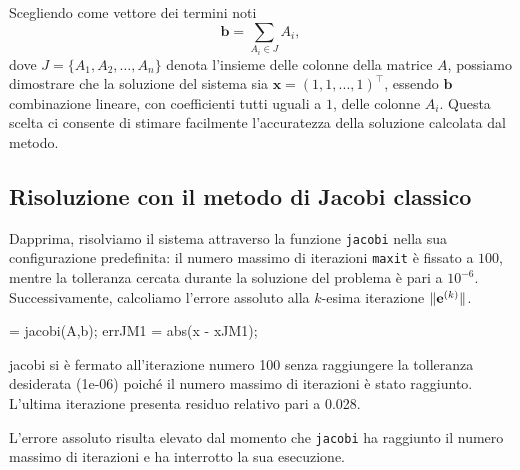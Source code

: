 Scegliendo come vettore dei termini noti
\begin{equation*}
    \mathbf{b} = \sum_ {A_{i} \in J} A_{i},
\end{equation*}
dove $J = \{A_{1}, A_{2},\dots,A_{n}\}$ denota l'insieme delle colonne della matrice $A$, possiamo dimostrare che la soluzione
del sistema sia $\mathbf{x} = (1, 1, ..., 1)^\top$, essendo $\mathbf{b}$ combinazione lineare, con coefficienti tutti uguali a $\num{1}$, delle colonne $A_{i}$. \newline
Questa scelta ci consente di stimare facilmente l'accuratezza della soluzione calcolata dal metodo.
\subsection{Risoluzione con il metodo di Jacobi classico}
Dapprima, risolviamo il sistema attraverso la funzione \lstinline{jacobi} nella sua configurazione predefinita:
il numero massimo di iterazioni \lstinline{maxit} \`e fissato a $\num{100}$, mentre la tolleranza cercata durante la soluzione del problema \`e pari a ${10}^{-6}$.\newline
    Successivamente, calcoliamo l'errore assoluto alla $k$-esima iterazione $\lVert\mathbf{e}^{(k)}\rVert$.
    \begin{matlabcode}
     = jacobi(A,b);
    errJM1 = abs(x - xJM1);
    \end{matlabcode}
    \begin{matlaboutput}
    jacobi si è fermato all'iterazione numero 100 senza
    raggiungere la tolleranza desiderata (1e-06) poiché
    il numero massimo di iterazioni è stato raggiunto.
    L'ultima iterazione presenta residuo relativo
    pari a 0.028.
    \end{matlaboutput}
    L'errore assoluto risulta elevato dal momento che \lstinline{jacobi} ha raggiunto il numero massimo di iterazioni e ha interrotto la sua esecuzione.

